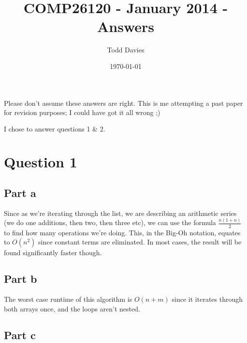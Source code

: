 \documentclass{article}
\author{Todd Davies}
\title{COMP26120 - January 2014 - Answers}
\date{\today}
\begin{document}
\lhead{\today}

\maketitle

\begin{center}
	\small Please don't assume these answers are right. This is me attempting a
	past paper for revision purposes; I could have got it all wrong ;)

  I chose to answer questions 1 \& 2.
\end{center}

\section{Question 1}

\subsection{Part a}



Since as we're iterating through the list, we are describing an arithmetic series
(we do one additions, then two, then three etc), we can use the formula
$\frac{n(1+n)}{2}$ to find how many operations we're doing. This, in the Big-Oh
notation, equates to $O(n^2)$ since constant terms are eliminated. In most
cases, the result will be found significantly faster though.

\newpage

\subsection{Part b}



The worst case runtime of this algorithm is $O(n + m)$ since it iterates through
both arrays once, and the loops aren't nested.

\newpage

\subsection{Part c}
\end{document}
